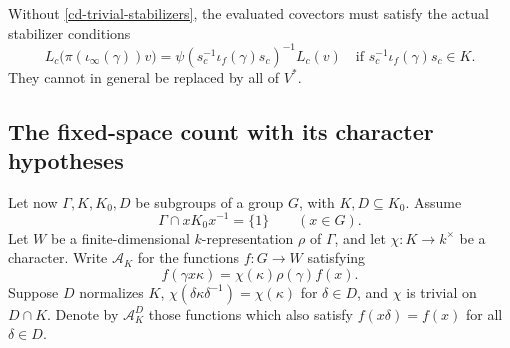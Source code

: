 Without \eqref{cd-trivial-stabilizers}, the evaluated covectors
must satisfy the actual stabilizer conditions
\[
 L_c\bigl(\pi(\iota_\infty(\gamma))v\bigr)
   =\psi(s_c^{-1}\iota_f(\gamma)s_c)^{-1}L_c(v)
 \quad\text{if }s_c^{-1}\iota_f(\gamma)s_c\in K.
\]
They cannot in general be replaced by all of $V^*$.

\subsection{The fixed-space count with its character hypotheses}

Let now $\Gamma,K,K_0,D$ be subgroups of a group $G$, with
$K,D\subseteq K_0$. Assume
\begin{equation}\label{cd-neat}
                         \Gamma\cap xK_0x^{-1}=\{1\}
                                             \qquad(x\in G).
\end{equation}
Let $W$ be a finite-dimensional $k$-representation $\rho$ of
$\Gamma$, and let $\chi:K\to k^\times$ be a character.
Write $\mathcal A_K$ for the functions $f:G\to W$ satisfying
\[
                         f(\gamma x\kappa)
                                =\chi(\kappa)\rho(\gamma)f(x).
\]
Suppose $D$ normalizes $K$, $\chi(\delta\kappa\delta^{-1})
=\chi(\kappa)$ for $\delta\in D$, and $\chi$ is trivial on
$D\cap K$. Denote by $\mathcal A_K^D$ those functions which
also satisfy $f(x\delta)=f(x)$ for all $\delta\in D$.

